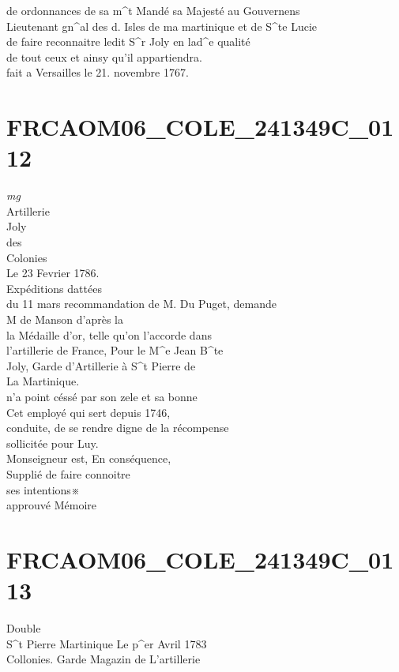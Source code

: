 \documentclass{article}
\begin{document}
\begin{pages}
de ordonnances de sa m\^{}t Mandé sa Majesté au Gouvernens\\
Lieutenant gn\^{}al des d. Isles de ma martinique et de S\^{}te Lucie\\
de faire reconnaitre ledit S\^{}r Joly en lad\^{}e qualité\\
de tout ceux et ainsy qu'il appartiendra.\\
fait a Versailles le 21. novembre 1767.
\pend
\endnumbering\beginnumbering\section{FRCAOM06\_COLE\_241349C\_0112}
\vspace{0.5cm}\noindent
\textit{mg}
\footnotesize \\
Artillerie\\
Joly\\
des\\
Colonies\\
Le 23 Fevrier 1786.\\
Expéditions dattées\\
du 11 mars
\normalsize \pstart
recommandation de M. Du Puget, demande\\
M de Manson d'après la\\
la Médaille d'or, telle qu'on l'accorde dans\\
l'artillerie de France, Pour le M\^{}e Jean B\^{}te\\
Joly, Garde d'Artillerie à S\^{}t Pierre de\\
La Martinique.\\
n'a point céssé par son zele et sa bonne\\
Cet employé qui sert depuis 1746,\\
conduite, de se rendre digne de la récompense\\
sollicitée pour Luy.\\
Monseigneur est, En conséquence,\\
Supplié de faire connoitre\\
ses intentions※\\
approuvé
\pend\pstart
Mémoire
\pend
\endnumbering\beginnumbering\section{FRCAOM06\_COLE\_241349C\_0113}\pstart
Double\\
S\^{}t Pierre Martinique Le p\^{}er Avril 1783\\
Collonies. Garde Magazin de L'artillerie\\

\end{pages}
\end{document}

